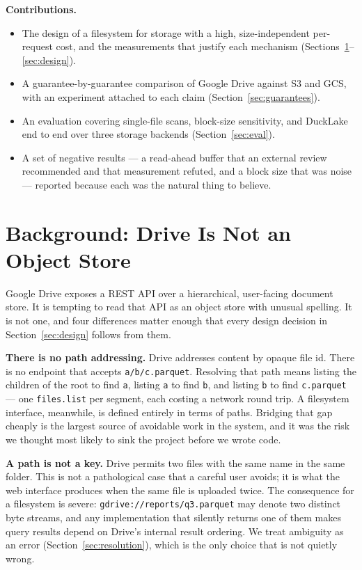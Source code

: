 \documentclass[sigconf, nonacm]{acmart}
\begin{document}
\textbf{Contributions.}
\begin{itemize}
\item The design of a filesystem for storage with a high, size-independent
  per-request cost, and the measurements that justify each mechanism
  (Sections~\ref{sec:background}--\ref{sec:design}).
\item A guarantee-by-guarantee comparison of Google Drive against S3 and GCS,
  with an experiment attached to each claim (Section~\ref{sec:guarantees}).
\item An evaluation covering single-file scans, block-size sensitivity, and
  DuckLake end to end over three storage backends
  (Section~\ref{sec:eval}).
\item A set of negative results --- a read-ahead buffer that an external review
  recommended and that measurement refuted, and a block size that was noise ---
  reported because each was the natural thing to believe.
\end{itemize}

\section{Background: Drive Is Not an Object Store}
\label{sec:background}

Google Drive exposes a REST API over a hierarchical, user-facing document
store. It is tempting to read that API as an object store with unusual
spelling. It is not one, and four differences matter enough that every design
decision in Section~\ref{sec:design} follows from them.

\textbf{There is no path addressing.}
Drive addresses content by opaque file id. There is no endpoint that accepts
\texttt{a/b/c.parquet}. Resolving that path means listing the children of the
root to find \texttt{a}, listing \texttt{a} to find \texttt{b}, and listing
\texttt{b} to find \texttt{c.parquet} --- one \texttt{files.list} per segment,
each costing a network round trip. A filesystem interface, meanwhile, is
defined entirely in terms of paths. Bridging that gap cheaply is the largest source
of avoidable work in the system, and it was the risk we thought most likely to
sink the project before we wrote code.

\textbf{A path is not a key.}
Drive permits two files with the same name in the same folder. This is not a
pathological case that a careful user avoids; it is what the web interface
produces when the same file is uploaded twice. The consequence for a
filesystem is severe: \texttt{gdrive://reports/q3.parquet} may denote two
distinct byte streams, and any implementation that silently returns one of
them makes query results depend on Drive's internal result ordering. We treat
ambiguity as an error (Section~\ref{sec:resolution}), which is the only
choice that is not quietly wrong.
\end{document}
